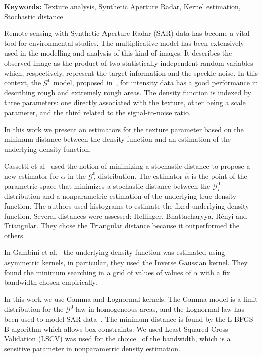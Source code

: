 \documentclass[a4paper]{article} %
\def\keywords#1{{\bf Keywords: }{#1}}
\begin{document}
\keywords{Texture analysis, Synthetic Aperture Radar, Kernel estimation, Stochastic distance}

\vspace{0.5cm}
Remote sensing with Synthetic Aperture Radar (SAR) data has become a vital tool for environmental studies. 
The multiplicative model has been extensively used in the modelling and analysis of this kind of images. 
It describes the observed image as the product of two statistically independent random variables which, respectively, represent the target information and the speckle noise. 
In this context, the $\mathcal{G}^{0}$ model, proposed in~\cite{Frery97}, for intensity data has a good performance in describing rough and extremely rough areas. 
The density function is indexed by three parameters: one directly associated with the texture, other being a scale parameter, and the third related to the signal-to-noise ratio.

In this work we present an estimators for the texture parameter based on the minimum distance between the density function and an estimation of the underlying density function.

Cassetti et al~\cite{APSAR2013ParameterEstimationStochasticDistances} used the notion of minimizing a stochastic distance to propose a new estimator for $\alpha$ in the $\mathcal{G}_I^0$ distribution.
The estimator $\widehat{\alpha}$ is the point of the parametric space that minimizes a stochastic distance between the $\mathcal{G}_I^0$ distribution and a nonparametric estimation of the underlying true density function. 
The authors used histograms to estimate the fixed underlying density function. Several distances were assessed: Hellinger, Bhattacharyya, R\'enyi and Triangular. They chose the Triangular distance because it outperformed the others. 

In Gambini et al.~\cite{gambini2015} the underlying density function was estimated using asymmetric kernels, in particular, they used the Inverse Gaussian kernel. 
They found the minimum searching in a grid of values of values of $\alpha$ with a fix bandwidth chosen empirically.

In this work we use Gamma and Lognormal kernels.
The Gamma model is a limit distribution for the $\mathcal{G}^0$ law in homogeneous areas, and the Lognormal law has been used to model SAR data~\cite{Szajnowski1977}. 
The minimum distance is found by the L-BFGS-B algorithm which allows box constraints. 
We used Least Squared Cross-Validation (LSCV) was used for the choice~\cite{Rudemo1982} of the bandwidth, which is a sensitive parameter in nonparametric density estimation. 
\end{document}
